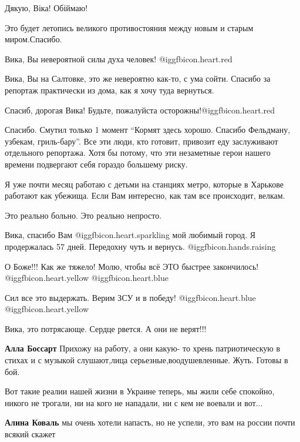 \begin{itemize}
Дякую, Віка! Обіймаю!

Это будет летопись великого противостояния между новым и старым миром.Спасибо.

Вика, Вы невероятной силы духа человек! @igg{fbicon.heart.red}


Вика, Вы на Салтовке, это же невероятно как-то, с ума сойти. Спасибо за
репортаж практически из дома, как я хочу туда вернуться.

Спасиб, дорогая Вика! Будьте, пожалуйста осторожны!@igg{fbicon.heart.red}


Спасибо. Смутил только 1 момент \enquote{Кормят здесь хорошо. Спасибо Фельдману,
узбекам, гриль-бару}. Все эти люди, кто готовит, привозит еду заслуживают
отдельного репортажа. Хотя бы потому, что эти незаметные герои нашего времени
подвергают себя гораздо большему риску.


Я уже почти месяц работаю с детьми на станциях метро, которые в Харькове
работают как убежища. Если Вам интересно, как там все происходит, велкам.

Это реально больно.
Это реально непросто.

Вика, спасибо Вам  @igg{fbicon.heart.sparkling}  мой любимый город. Я продержалась 57 дней. Передохну чуть и вернусь. @igg{fbicon.hands.raising} 

О Боже!!! Как же тяжело! Молю, чтобы всё ЭТО быстрее закончилось!  @igg{fbicon.heart.yellow}  @igg{fbicon.heart.blue} 

Сил все это выдержать. Верим ЗСУ и в победу!  @igg{fbicon.heart.blue}  @igg{fbicon.heart.yellow} 

Вика, это потрясающе. Сердце рвется. А они не верят!!!

\textbf{Алла Боссарт} Прихожу на работу, а они какую- то хрень патриотическую в стихах и с музыкой слушают,лица серьезные,воодушевленные. Жуть. Готовы в бой.


Вот такие реалии нашей жизни в Украине теперь, мы жили себе спокойно, никого не
трогали, ни на кого не нападали, ни с кем не воевали и вот...

\begin{itemize} %
\textbf{Алина Коваль} мы очень хотели напасть, но не успели, это вам на россии почти всякий скажет


\end{itemize}
\end{itemize}
